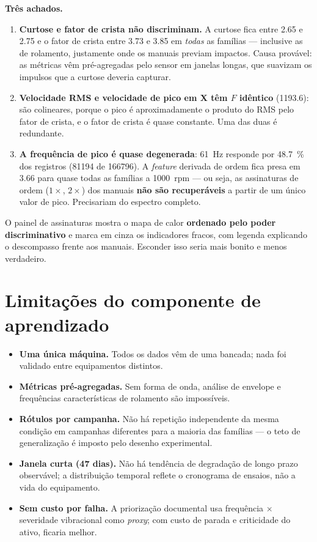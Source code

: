 \textbf{Três achados.}

\begin{enumerate}
  \item \textbf{Curtose e fator de crista não discriminam.} A curtose fica entre
    \num{2,65} e \num{2,75} e o fator de crista entre \num{3,73} e \num{3,85}
    em \emph{todas} as famílias --- inclusive as de rolamento, justamente onde
    os manuais previam impactos. Causa provável: as métricas vêm pré-agregadas
    pelo sensor em janelas longas, que suavizam os impulsos que a curtose
    deveria capturar.
  \item \textbf{Velocidade RMS e velocidade de pico em X têm $F$
    idêntico} (\num{1193.6}): são colineares, porque o pico é aproximadamente o
    produto do RMS pelo fator de crista, e o fator de crista é quase constante.
    Uma das duas é redundante.
  \item \textbf{A frequência de pico é quase degenerada}: \SI{61}{\hertz}
    responde por \SI{48.7}{\percent} dos registros (\num{81194} de
    \num{166796}). A \textit{feature} derivada de ordem fica presa em
    \num{3,66} para quase todas as famílias a \SI{1000}{rpm} --- ou seja, as
    assinaturas de ordem ($1\times$, $2\times$) dos manuais \textbf{não são
    recuperáveis} a partir de um único valor de pico. Precisariam do espectro
    completo.
\end{enumerate}

\begin{decisao}
O painel de assinaturas mostra o mapa de calor \textbf{ordenado pelo poder
discriminativo} e marca em cinza os indicadores fracos, com legenda explicando
o descompasso frente aos manuais. Esconder isso seria mais bonito e menos
verdadeiro.
\end{decisao}

\section{Limitações do componente de aprendizado}

\begin{limitacao}
\begin{itemize}
  \item \textbf{Uma única máquina.} Todos os dados vêm de uma bancada; nada foi
    validado entre equipamentos distintos.
  \item \textbf{Métricas pré-agregadas.} Sem forma de onda, análise de envelope
    e frequências características de rolamento são impossíveis.
  \item \textbf{Rótulos por campanha.} Não há repetição independente da mesma
    condição em campanhas diferentes para a maioria das famílias --- o teto de
    generalização é imposto pelo desenho experimental.
  \item \textbf{Janela curta (47 dias).} Não há tendência de degradação de longo
    prazo observável; a distribuição temporal reflete o cronograma de ensaios,
    não a vida do equipamento.
  \item \textbf{Sem custo por falha.} A priorização documental usa frequência
    $\times$ severidade vibracional como \textit{proxy}; com custo de parada e
    criticidade do ativo, ficaria melhor.
\end{itemize}
\end{limitacao}
